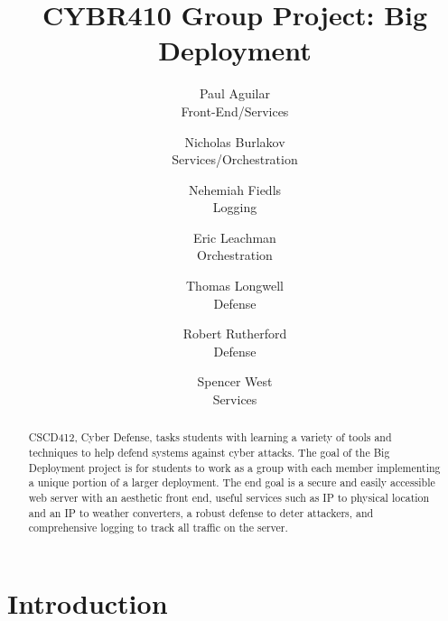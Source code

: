 \documentclass[letterpaper,twocolumn,10pt]{article}
\begin{document}

\date{}

\title{\Large \bf CYBR410 Group Project: Big Deployment}

\author{
  {\rm Paul Aguilar}\\
  Front-End/Services
  \and
  {\rm Nicholas Burlakov}\\
  Services/Orchestration
  \and
  {\rm Nehemiah Fiedls}\\
  Logging
  \and
  {\rm Eric Leachman}\\
  Orchestration
  \and
  {\rm Thomas Longwell}\\
  Defense
  \and
  {\rm Robert Rutherford}\\
  Defense
  \and
  {\rm Spencer West}\\
  Services
  \and
}

\maketitle

\begin{abstract}
CSCD412, Cyber Defense, tasks students with learning a variety of tools and 
techniques to help defend systems against cyber attacks. The goal of the Big Deployment project is for students to work as a group with each member implementing a unique portion of a larger deployment. The end goal is a secure and easily accessible web server with an aesthetic front end, useful services such as IP to physical location and an IP to weather converters, a robust defense to deter attackers, and comprehensive logging to track all traffic on the server. 
\end{abstract}


\section{Introduction} \label{Introduction}


\end{document}
